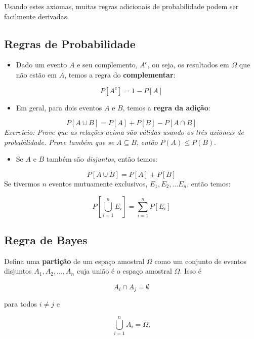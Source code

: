 \documentclass[]{article}
\providecommand{\tightlist}{%
  \setlength{\itemsep}{0pt}\setlength{\parskip}{0pt}}
\begin{document}
Usando estes axiomas, muitas regras adicionais de probabilidade podem
ser facilmente derivadas.

\subsection{Regras de Probabilidade}\label{regras-de-probabilidade}

\begin{itemize}
\tightlist
\item
  Dado um evento \(A\) e seu complemento, \(A^c\), ou seja, os
  resultados em \(\Omega\) que não estão em \(A\), temos a regra do
  \textbf{complementar}:
\end{itemize}

\[P[A^c] = 1 - P [A]\]

\begin{itemize}
\tightlist
\item
  Em geral, para dois eventos \(A\) e \(B\), temos a \textbf{regra da
  adição}:
\end{itemize}

\[P[A \cup B] = P[A] + P[B] - P[A \cap B]\] \emph{Exercício: Prove que
as relações acima são válidas usando os três axiomas de probabilidade.
Prove também que se} \(A\subseteq B\), \emph{então} \(P(A)\leq P(B)\).

\begin{itemize}
\tightlist
\item
  Se \(A\) e \(B\) também são \emph{disjuntos}, então temos:
\end{itemize}

\[ P[A \cup B] = P[A] + P[B] \] Se tivermos \(n\) eventos mutuamente
exclusivos, \(E_1, E_2,\ldots E_n\), então temos:

\[ P\left[\textstyle \bigcup_{i = 1}^{n} E_i \right] = \sum_{i = 1}^{n} P[E_i] \]

\subsection{Regra de Bayes}\label{regra-de-bayes}

Defina uma \textbf{partição} de um espaço amostral \(\Omega\) como um
conjunto de eventos disjuntos \(A_1, A_2, \ldots, A_n\) cuja união é o
espaço amostral \(\Omega\). Isso é

\[A_i \cap A_j = \emptyset \]

para todos \(i \neq j\) e

\[ \bigcup_{i = 1}^{n} A_i = \Omega. \]
\end{document}
